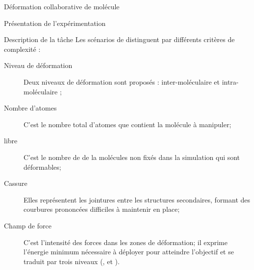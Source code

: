 \documentclass[myfrancais,ngerman,english,frenchb]{mythesis}
\begin{document}
\begin{mychapter}{Déformation collaborative de molécule}
\begin{mysection}{Présentation de l'expérimentation}
\begin{mysubsection}{Description de la tâche}
				Les scénarios de distinguent par différents critères de complexité :
				\begin{description}
					\item[Niveau de déformation] Deux niveaux de déformation sont proposés : inter-moléculaire et intra-moléculaire ;
					\item[Nombre d'atomes] C'est le nombre total d'atomes que contient la molécule à manipuler;
					\item[ libre] C'est le nombre de  de la molécules non fixés dans la simulation qui sont déformables;
					\item[Cassure] Elles représentent les jointures entre les structures secondaires, formant des courbures prononcées difficiles à maintenir en place;
					\item[Champ de force] C'est l'intensité des forces dans les zones de déformation; il exprime l'énergie minimum nécessaire à déployer pour atteindre l'objectif et se traduit par trois niveaux (,  et ).
				\end{description}


\end{mysubsection}
\end{mysection}
\end{mychapter}
\end{document}
